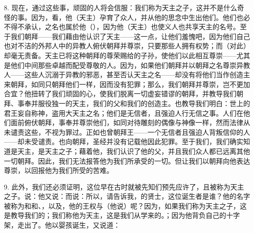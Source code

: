 8. 现在，通过这些事，顽固的人将会信服：我们称为天主之子，这并不是什么奇怪的事。因为，看，他（天主）孕育了众人，并从他的思念中生出他们。他们也必不得不承认，之名也属於他（），因为他（天主）也使义人也共享天主的名号。至于我们朝拜——我们藉由他认识了天主——这一点，让他们羞愧吧，因为他们自己也对不洁的外邦人中的异教人俯伏朝拜并尊崇，只要那些人拥有权势；而（对此）却毫无责备。天主已将这种朝拜的尊荣赐给的子孙，使他们以此相互尊崇——尤其是他们中间那些卓越而配受尊敬的人。因为，如果他们朝拜并以朝拜之名尊崇异教人——这些人沉溺于异教的邪恶，甚至否认天主之名——却没有将他们当作创造主来朝拜，如同只朝拜他们一样，因而没有犯罪；那么，我们朝拜并尊崇，岂不更加合宜？他扭转了我们顽固的心，使我们脱离一切虚妄错谬的朝拜，并教导我们朝拜、事奉并服役独一的天主，我们的父和我们的创造主。也教导我们明白：世上的君王妄自称神，盗用大天主之名；他们是无信者，且强迫人行无信之事。人们在他们面前俯伏朝拜，事奉并尊崇他们，如同对待雕刻的偶像与神像一样，然而法律从未谴责这些，不视为罪过。正如也曾朝拜王——一个无信者且强迫人背叛信仰的人——却未受谴责。也向朝拜，圣经并没有记载他因此犯罪。至于我们，我们确实知道是天主，是天主之子；藉着他，我们认识了他的父，并且我们众人都已远离其他一切朝拜。因此，我们无法报答他为我们所承受的一切。但让我们以朝拜向他表达尊崇，以回报他为我们所受的苦难。\par

9. 此外，我们还必须证明，这位早在古时就被先知们预先应许了，且被称为天主之子。说：他又说：而说：所以，请告诉我，的贤士，这位诞生者是谁？他的名字被称为和和、，以及，他的王权与（他说）呢？因为，如果我们称为天主之子，这是教导我们的；我们称他为天主，这是我们从学来的。；因为他背负自己的十字架，走出了。他以婴孩诞生，又说道：\par

